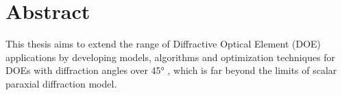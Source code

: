 

\cleardoublepage
\chapter*{Abstract}
This thesis aims to extend the range of Diffractive Optical Element (DOE) applications by developing models, algorithms and optimization techniques for DOEs with diffraction angles over \ang{45} , which is far beyond the limits of scalar paraxial diffraction model.










\vfill
